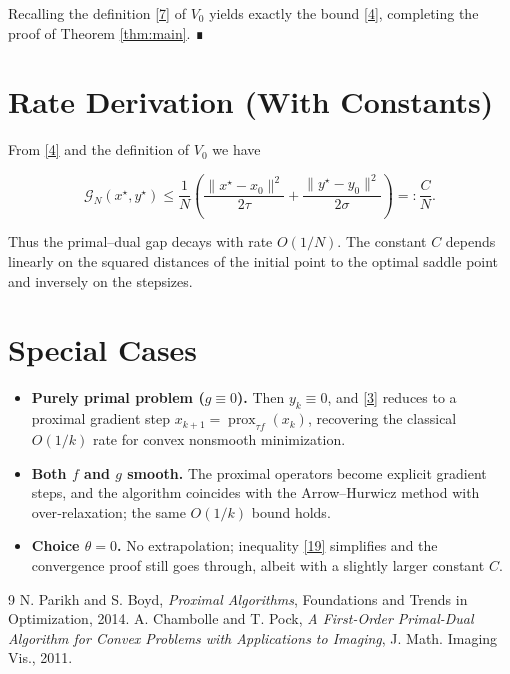 \documentclass{article}
\begin{document}
Recalling the definition \eqref{7} of $V_{0}$ yields exactly the bound \eqref{4}, completing the proof of Theorem \ref{thm:main}. ∎

\section*{Rate Derivation (With Constants)}
From \eqref{4} and the definition of $V_{0}$ we have

\[
\mathcal{G}_{N}(x^{\star},y^{\star})
\le\frac{1}{N}
\left(
\frac{\|x^{\star}-x_{0}\|^{2}}{2\tau}
+\frac{\|y^{\star}-y_{0}\|^{2}}{2\sigma}
\right)
=: \frac{C}{N}.
\]

Thus the primal–dual gap decays with rate $O(1/N)$. The constant $C$ depends linearly on the squared distances of the initial point to the optimal saddle point and inversely on the stepsizes.

\section*{Special Cases}
\begin{itemize}
  \item \textbf{Purely primal problem ($g\equiv0$).} Then $y_{k}\equiv0$, and \eqref{3} reduces to a proximal gradient step
    $x_{k+1}=\operatorname{prox}_{\tau f}(x_{k})$, recovering the classical $O(1/k)$ rate for convex nonsmooth minimization.
  \item \textbf{Both $f$ and $g$ smooth.} The proximal operators become explicit gradient steps, and the algorithm coincides with the Arrow–Hurwicz method with over‑relaxation; the same $O(1/k)$ bound holds.
  \item \textbf{Choice $\theta=0$.} No extrapolation; inequality \eqref{19} simplifies and the convergence proof still goes through, albeit with a slightly larger constant $C$.
\end{itemize}


\begin{thebibliography}{9}
N. Parikh and S. Boyd, \emph{Proximal Algorithms}, Foundations and Trends in Optimization, 2014.
A. Chambolle and T. Pock, \emph{A First-Order Primal-Dual Algorithm for Convex Problems with Applications to Imaging}, J. Math. Imaging Vis., 2011.
\end{thebibliography}
\end{document}
